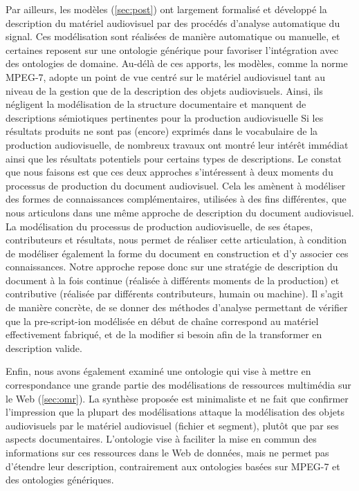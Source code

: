 	Par ailleurs, les modèles  (\ref{sec:post}) ont largement formalisé et développé la description du matériel audiovisuel par des procédés d'analyse automatique du signal.
	Ces modélisation sont réalisées de manière automatique ou manuelle, et certaines reposent sur une ontologie générique pour favoriser l'intégration avec des ontologies de domaine.
	Au-délà de ces apports, les modèles, comme la norme MPEG-7, adopte un point de vue centré sur le matériel audiovisuel tant au niveau de la gestion que de la description des objets audiovisuels. 
	Ainsi, ils négligent la modélisation de la structure documentaire et manquent de descriptions sémiotiques pertinentes pour la production audiovisuelle
	Si les résultats produits ne sont pas (encore) exprimés dans le vocabulaire de la production audiovisuelle, de nombreux travaux ont montré leur intérêt immédiat ainsi que les résultats potentiels pour certains types de descriptions.
	Le constat que nous faisons est que ces deux approches s'intéressent à deux moments du processus de production du document audiovisuel.
	Cela les amènent à modéliser des formes de connaissances complémentaires, utilisées à des fins différentes, que nous articulons dans une même approche de description du document audiovisuel.
	La modélisation du processus de production audiovisuelle, de ses étapes, contributeurs et résultats, nous permet de réaliser cette articulation, à condition de modéliser également la forme du document en construction et d'y associer ces connaissances.
	Notre approche repose donc sur une stratégie de description du document à la fois continue (réalisée à différents moments de la production) et contributive (réalisée par différents contributeurs, humain ou machine). 
	Il s'agit de manière concrète, de se donner des méthodes d'analyse permettant de vérifier que la pre-script-ion modélisée en début de chaîne correspond au matériel effectivement fabriqué, et de la modifier si besoin afin de la transformer en description valide.

Enfin, nous avons également examiné une ontologie qui vise à mettre en correspondance une grande partie des modélisations de ressources multimédia sur le Web (\ref{sec:omr}).
La synthèse proposée est minimaliste et ne fait que confirmer l'impression que la plupart des modélisations attaque la modélisation des objets audiovisuels par le matériel audiovisuel (fichier et segment), plutôt que par ses aspects documentaires.
L'ontologie vise à faciliter la mise en commun des informations sur ces ressources dans le Web de données, mais ne permet pas d'étendre leur description, contrairement aux ontologies basées sur MPEG-7 et des ontologies génériques.

